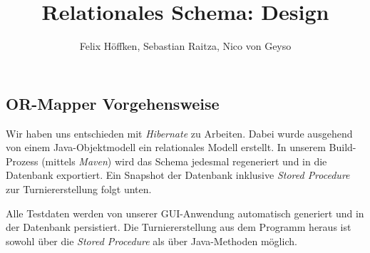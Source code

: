 \documentclass[11pt,german]{scrartcl}
\title{Relationales Schema: Design}
\author{Felix Höffken, Sebastian Raitza, Nico von Geyso}
\date{}
\begin{document}
\renewcommand{\labelenumi}{\alph{enumi})}
\renewcommand{\labelenumii}{$\bullet$}





\maketitle

\subsection*{OR-Mapper Vorgehensweise}
Wir haben uns entschieden mit \emph{Hibernate} zu Arbeiten. Dabei wurde ausgehend von einem Java-Objektmodell ein relationales Modell erstellt. In unserem Build-Prozess (mittels \emph{Maven}) wird das Schema jedesmal regeneriert und in die Datenbank exportiert. Ein Snapshot der Datenbank inklusive \emph{Stored Procedure} zur Turniererstellung folgt unten.

Alle Testdaten werden von unserer GUI-Anwendung automatisch generiert und in der Datenbank persistiert. Die Turniererstellung  aus dem Programm heraus ist sowohl über die \emph{Stored Procedure} als über Java-Methoden möglich.
\end{document}
